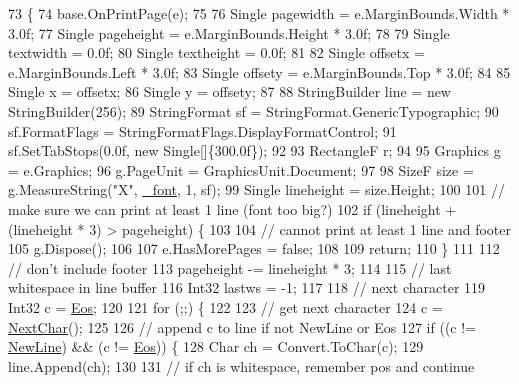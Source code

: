 \begin{DoxyCode}
73     \{
74         base.OnPrintPage(e);
75 
76         Single pagewidth = e.MarginBounds.Width * 3.0f;
77         Single pageheight = e.MarginBounds.Height * 3.0f;
78 
79         Single textwidth = 0.0f;
80         Single textheight = 0.0f;
81 
82         Single offsetx = e.MarginBounds.Left * 3.0f;
83         Single offsety = e.MarginBounds.Top * 3.0f;
84 
85         Single x = offsetx;
86         Single y = offsety;
87 
88         StringBuilder line = \textcolor{keyword}{new} StringBuilder(256);
89         StringFormat sf = StringFormat.GenericTypographic;
90         sf.FormatFlags = StringFormatFlags.DisplayFormatControl;
91         sf.SetTabStops(0.0f, \textcolor{keyword}{new} Single[]\{300.0f\});
92 
93         RectangleF r;
94 
95         Graphics g = e.Graphics;
96         g.PageUnit = GraphicsUnit.Document;
97 
98         SizeF size = g.MeasureString(\textcolor{stringliteral}{"X"}, \hyperlink{class_multipad_print_document_abfb15491f048283a8868a3b410f8b78e}{\_font}, 1, sf);
99         Single lineheight = size.Height;
100 
101         \textcolor{comment}{// make sure we can print at least 1 line (font too big?)}
102         \textcolor{keywordflow}{if} (lineheight + (lineheight * 3) > pageheight) \{
103 
104             \textcolor{comment}{// cannot print at least 1 line and footer}
105             g.Dispose();
106 
107             e.HasMorePages = \textcolor{keyword}{false};
108 
109             \textcolor{keywordflow}{return};
110         \}
111 
112         \textcolor{comment}{// don't include footer}
113         pageheight -= lineheight * 3;
114 
115         \textcolor{comment}{// last whitespace in line buffer}
116         Int32 lastws = -1;
117 
118         \textcolor{comment}{// next character}
119         Int32 c = \hyperlink{class_multipad_print_document_adfd2fe48dc1a582ea58044a93dda2353}{Eos};
120 
121         \textcolor{keywordflow}{for} (;;) \{
122 
123             \textcolor{comment}{// get next character}
124             c = \hyperlink{class_multipad_print_document_a0795165575b0075bff77d2fcc7c0699f}{NextChar}();
125 
126             \textcolor{comment}{// append c to line if not NewLine or Eos}
127             \textcolor{keywordflow}{if} ((c != \hyperlink{class_multipad_print_document_a4a051275c8477606d5ef1d8f89cc54ca}{NewLine}) && (c != \hyperlink{class_multipad_print_document_adfd2fe48dc1a582ea58044a93dda2353}{Eos})) \{
128                 Char ch = Convert.ToChar(c);
129                 line.Append(ch);
130 
131                 \textcolor{comment}{// if ch is whitespace, remember pos and continue}

\end{DoxyCode}
